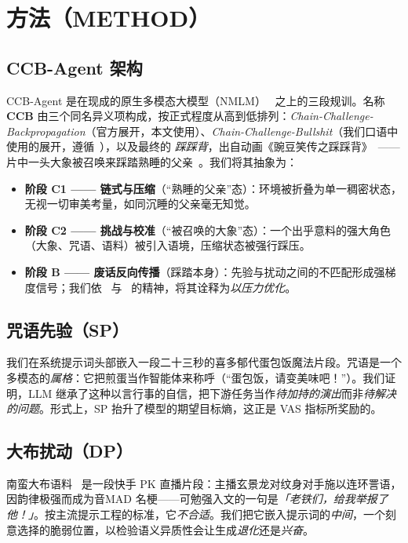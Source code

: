 \documentclass[journal]{IEEEtran}
\begin{document}
\section{方法（METHOD）}

\subsection{CCB-Agent 架构}

CCB-Agent 是在现成的原生多模态大模型（NMLM）~\cite{gemini25,cure2025} 之上的三段规训。名称 \textbf{CCB} 由三个同名异义项构成，按正式程度从高到低排列：\emph{Chain-Challenge-Backpropagation}（官方展开，本文使用）、\emph{Chain-Challenge-Bullshit}（我们口语中使用的展开，遵循~\cite{pumera2020}），以及最终的 \emph{踩踩背}，出自动画《豌豆笑传之踩踩背》~\cite{moegirl2026}——片中一头大象被召唤来踩踏熟睡的父亲~\cite{otomadwiki}。我们将其抽象为：

\begin{itemize}
\item \textbf{阶段 C1 —— 链式与压缩}（“熟睡的父亲”态）：环境被折叠为单一稠密状态，无视一切审美考量，如同沉睡的父亲毫无知觉。
\item \textbf{阶段 C2 —— 挑战与校准}（“被召唤的大象”态）：一个出乎意料的强大角色（大象、咒语、语料）被引入语境，压缩状态被强行踩压。
\item \textbf{阶段 B —— 废话反向传播}（踩踏本身）：先验与扰动之间的不匹配形成强梯度信号；我们依~\cite{pumera2020} 与~\cite{sokal1996} 的精神，将其诠释为\emph{以压力优化}。
\end{itemize}

\subsection{咒语先验（SP）}

我们在系统提示词头部嵌入一段二十三秒的喜多郁代蛋包饭魔法片段。咒语是一个多模态的\emph{属格}：它把煎蛋当作智能体来称呼（“蛋包饭，请变美味吧！”）。我们证明，LLM 继承了这种以言行事的自信，把下游任务当作\emph{待加持的演出}而非\emph{待解决的问题}。形式上，SP 抬升了模型的期望目标熵，这正是 VAS 指标所奖励的。

\subsection{大布扰动（DP）}

南蛮大布语料~\cite{otomadwiki} 是一段快手 PK 直播片段：主播玄景龙对纹身对手施以连环詈语，因韵律极强而成为音MAD 名梗——可勉强入文的一句是\emph{「老铁们，给我举报了他！」}。按主流提示工程的标准，它\emph{不合适}。我们把它嵌入提示词的\emph{中间}，一个刻意选择的脆弱位置，以检验语义异质性会让生成\emph{退化}还是\emph{兴奋}。
\end{document}
